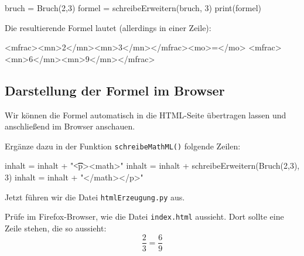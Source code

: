 \begin{codePython}
bruch = Bruch(2,3)
formel = schreibeErweitern(bruch, 3)
print(formel)
\end{codePython}

Die resultierende Formel lautet (allerdings in einer Zeile):

\begin{codeHTML}
<mfrac><mn>2</mn><mn>3</mn></mfrac><mo>=</mo>
									<mfrac><mn>6</mn><mn>9</mn></mfrac>
\end{codeHTML}

\subsection*{Darstellung der Formel im Browser}

Wir können die Formel automatisch in die HTML-Seite übertragen lassen und anschließend im Browser anschauen.

Ergänze dazu in der Funktion \texttt{schreibeMathML()} folgende Zeilen:

\begin{codePython}
inhalt = inhalt + "\n\t\t<p><math>"
inhalt = inhalt + schreibeErweitern(Bruch(2,3), 3)
inhalt = inhalt + "</math></p>"
\end{codePython}

Jetzt führen wir die Datei \texttt{htmlErzeugung.py} aus.

Prüfe im Firefox-Browser, wie die Datei \texttt{index.html} aussieht. Dort sollte eine Zeile stehen, die so aussieht:
\[
\frac{2}{3} = \frac{6}{9}
\]